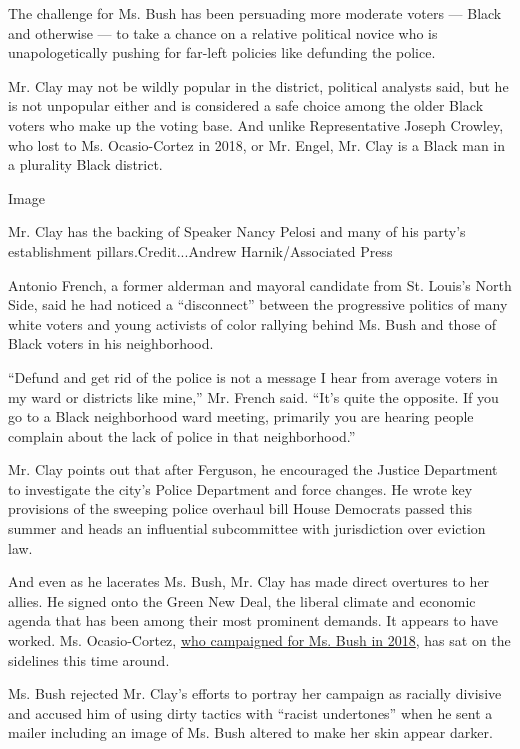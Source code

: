 The challenge for Ms. Bush has been persuading more moderate voters ---
Black and otherwise --- to take a chance on a relative political novice
who is unapologetically pushing for far-left policies like defunding the
police.

Mr. Clay may not be wildly popular in the district, political analysts
said, but he is not unpopular either and is considered a safe choice
among the older Black voters who make up the voting base. And unlike
Representative Joseph Crowley, who lost to Ms. Ocasio-Cortez in 2018, or
Mr. Engel, Mr. Clay is a Black man in a plurality Black district.

Image

Mr. Clay has the backing of Speaker Nancy Pelosi and many of his party's
establishment pillars.Credit...Andrew Harnik/Associated Press

Antonio French, a former alderman and mayoral candidate from St. Louis's
North Side, said he had noticed a ``disconnect'' between the progressive
politics of many white voters and young activists of color rallying
behind Ms. Bush and those of Black voters in his neighborhood.

``Defund and get rid of the police is not a message I hear from average
voters in my ward or districts like mine,'' Mr. French said. ``It's
quite the opposite. If you go to a Black neighborhood ward meeting,
primarily you are hearing people complain about the lack of police in
that neighborhood.''

Mr. Clay points out that after Ferguson, he encouraged the Justice
Department to investigate the city's Police Department and force
changes. He wrote key provisions of the sweeping police overhaul bill
House Democrats passed this summer and heads an influential subcommittee
with jurisdiction over eviction law.

And even as he lacerates Ms. Bush, Mr. Clay has made direct overtures to
her allies. He signed onto the Green New Deal, the liberal climate and
economic agenda that has been among their most prominent demands. It
appears to have worked. Ms. Ocasio-Cortez,
\href{https://www.nytimes3xbfgragh.onion/2018/08/05/us/politics/st-louis-cori-bush-ocasio-cortez.html}{who
campaigned for Ms. Bush in 2018}, has sat on the sidelines this time
around.

Ms. Bush rejected Mr. Clay's efforts to portray her campaign as racially
divisive and accused him of using dirty tactics with ``racist
undertones'' when he sent a mailer including an image of Ms. Bush
altered to make her skin appear darker.

